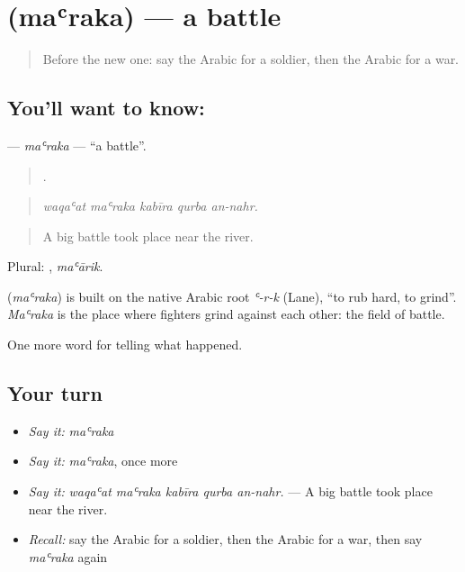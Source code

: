\section[\texorpdfstring{\ar{معركة} (maʿraka)}{معركة (maʿraka)}]{ (maʿraka) — a battle}

\label{lesson:AR-C307-maraka}



\begin{quote}
Before the new one: say the Arabic for a soldier, then the Arabic for a war.
\end{quote}

\subsection*{You'll want to know: }
\textbf{} — \emph{maʿraka} — \textquotedblleft{}a battle\textquotedblright{}.

\begin{quote}
    .
\end{quote}

\begin{quote}
\emph{waqaʿat maʿraka kabīra qurba an-nahr.}
\end{quote}

\begin{quote}
A big battle took place near the river.
\end{quote}

Plural: , \emph{maʿārik}.

\begin{cousinweb}
\textbf{} (\emph{maʿraka}) is built on the native Arabic root \emph{ʿ-r-k} (Lane), \textquotedblleft{}to rub hard, to grind\textquotedblright{}. \emph{Maʿraka} is the place where fighters grind against each other: the field of battle.
\end{cousinweb}

\begin{grammarlens}[title={What you've built}]
One more word for telling what happened.
\end{grammarlens}

\subsection*{Your turn}
\begin{itemize}
\raggedright
  \item \emph{Say it:} \emph{maʿraka}
  \item \emph{Say it:} \emph{maʿraka}, once more
  \item \emph{Say it:} \emph{waqaʿat maʿraka kabīra qurba an-nahr.} — A big battle took place near the river.
  \item \emph{Recall:} say the Arabic for a soldier, then the Arabic for a war, then say \emph{maʿraka} again
\end{itemize}

